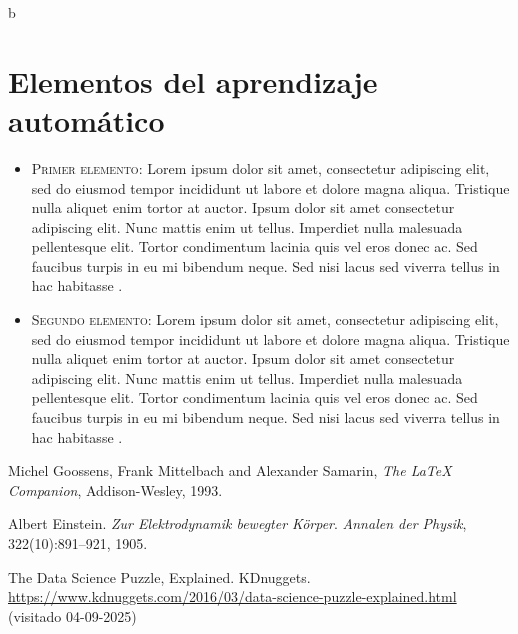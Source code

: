 b\documentclass[12pt]{article}
\begin{document}
\section{Elementos del aprendizaje automático}

\begin{itemize}
    \item \textsc{Primer elemento}: Lorem ipsum dolor sit amet, consectetur adipiscing elit, sed do eiusmod tempor incididunt ut labore et dolore magna aliqua. Tristique nulla aliquet enim tortor at auctor. Ipsum dolor sit amet consectetur adipiscing elit. Nunc mattis enim ut tellus. Imperdiet nulla malesuada pellentesque elit. Tortor condimentum lacinia quis vel eros donec ac. Sed faucibus turpis in eu mi bibendum neque. Sed nisi lacus sed viverra tellus in hac habitasse \cite{3}. 

    \item \textsc{Segundo elemento}: Lorem ipsum dolor sit amet, consectetur adipiscing elit, sed do eiusmod tempor incididunt ut labore et dolore magna aliqua. Tristique nulla aliquet enim tortor at auctor. Ipsum dolor sit amet consectetur adipiscing elit. Nunc mattis enim ut tellus. Imperdiet nulla malesuada pellentesque elit. Tortor condimentum lacinia quis vel eros donec ac. Sed faucibus turpis in eu mi bibendum neque. Sed nisi lacus sed viverra tellus in hac habitasse \cite{3}. 
\end{itemize}

\newpage
\begin{thebibliography}{a}


Michel Goossens, Frank Mittelbach and Alexander Samarin, \emph{The LaTeX Companion}, Addison-Wesley, 1993.

Albert Einstein. \emph{Zur Elektrodynamik bewegter K{\"o}rper}.
\emph{Annalen der Physik}, 322(10):891--921, 1905.

The Data Science Puzzle, Explained. KDnuggets. \\ \url{https://www.kdnuggets.com/2016/03/data-science-puzzle-explained.html} (visitado 04-09-2025)

\end{thebibliography}
\end{document}
